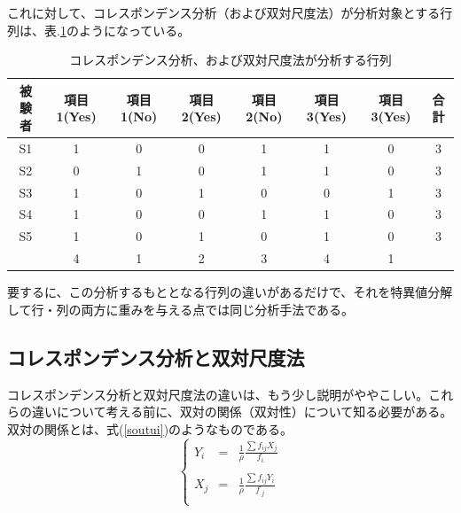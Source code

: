 \documentclass{ltjsbook}
\begin{document}
これに対して、コレスポンデンス分析（および双対尺度法）が分析対象とする行列は、表.\ref{corepon}のようになっている。
\begin{table}[h]
    \begin{center}
        \caption{コレスポンデンス分析、および双対尺度法が分析する行列}
        \begin{tabular}{c|cccccc|c}
            被験者 & 項目1(Yes) & 項目1(No) & 項目2(Yes) & 項目2(No) & 項目3(Yes) & 項目3(Yes) & 合計 \\
            \hline
            S1  & 1        & 0       & 0        & 1       & 1        & 0        & 3  \\
            S2  & 0        & 1       & 0        & 1       & 1        & 0        & 3  \\
            S3  & 1        & 0       & 1        & 0       & 0        & 1        & 3  \\
            S4  & 1        & 0       & 0        & 1       & 1        & 0        & 3  \\
            S5  & 1        & 0       & 1        & 0       & 1        & 0        & 3  \\
            \hline
                & 4        & 1       & 2        & 3       & 4        & 1        &    \\
        \end{tabular}
        \label{corepon}
    \end{center}
\end{table}

要するに、この分析するもととなる行列の違いがあるだけで、それを特異値分解して行・列の両方に重みを与える点では同じ分析手法である。
\subsection{コレスポンデンス分析と双対尺度法}
コレスポンデンス分析と双対尺度法の違いは、もう少し説明がややこしい。これらの違いについて考える前に、双対の関係（双対性）について知る必要がある。双対の関係とは、式(\ref{soutui})のようなものである。
\begin{equation}
    \label{soutui}
    \left \{
    \begin{array}{ccc}
        Y_{i} & = & \displaystyle{\frac{1}{\rho}\frac{\sum f_{ij}X_{j}}{f_{i.}}} \\
        \\
        X_{j} & = & \displaystyle{\frac{1}{\rho}\frac{\sum f_{ij}Y_{i}}{f_{.j}}} \\
    \end{array}
    \right.
\end{equation}
\end{document}
